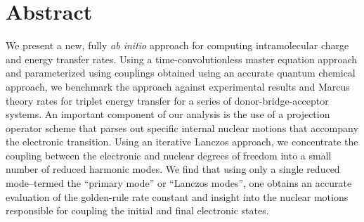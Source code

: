 \begingroup
\let\clearpage\relax
\let\cleardoublepage\relax
\let\cleardoublepage\relax
\chapter*{Abstract}
We present a new, fully {\em ab initio} approach for computing intramolecular charge and
energy transfer rates.  Using a time-convolutionless master equation approach and parameterized
using couplings obtained using an accurate quantum chemical approach, we  benchmark the approach
against  experimental results and Marcus theory rates for triplet energy transfer for a
series of donor-bridge-acceptor systems.
An important component of our analysis is the use of a projection operator scheme
that parses out specific internal nuclear motions that accompany
the electronic transition.
Using an iterative Lanczos approach, we  concentrate the coupling between the electronic and nuclear
degrees of freedom into a small number of reduced harmonic modes.
We find that  using only a single reduced mode--termed the ``primary mode'' or ``Lanczos modes'',
 one obtains an accurate evaluation of the golden-rule rate constant and
insight into the nuclear motions responsible for coupling the initial and final electronic states.

